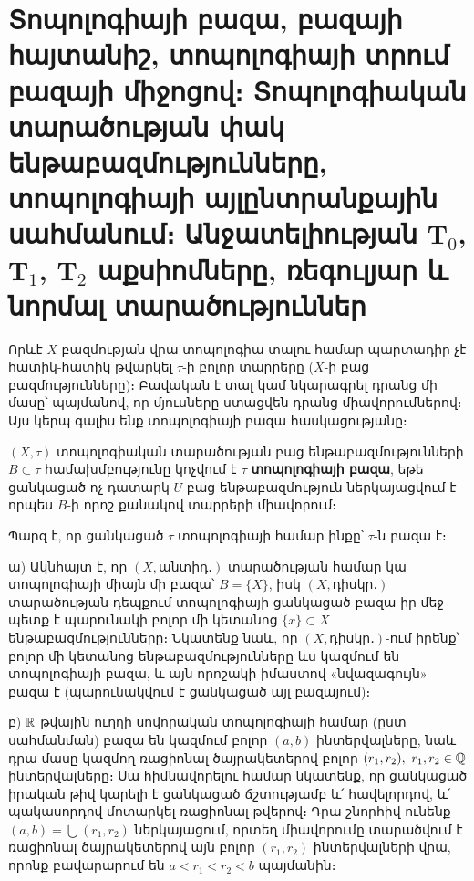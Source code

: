 \documentclass[./main.tex]{subfiles}
\begin{document}
\onehalfspacing
\section{Տոպո\-լոգիայի բազա, բազայի հայտանիշ, տոպո\-լոգիայի տրում բազայի միջոցով։ Տոպո\-լոգիական տարածության փակ ենթաբազմությունները, տոպո\-լոգիայի այլընտրանքային սահմանում։ Անջատելիության $\boldsymbol{\textrm{T}}_0$, $\boldsymbol{\textrm{T}}_1$, $\boldsymbol{\textrm{T}}_2$ աքսիոմները, ռեգուլյար և նորմալ տարածություններ}\label{sec:5}

\par Որևէ $X$ բազմության վրա տոպո\-լոգիա տալու համար պարտադիր չէ հատիկ-հատիկ թվարկել $\tau$-ի բոլոր տարրերը ($X$-ի բաց բազմությունները)։ Բավական է տալ կամ նկարագրել դրանց մի մասը՝ պայմանով, որ մյուսները ստացվեն դրանց միավորումներով։ Այս կերպ գալիս ենք տոպո\-լոգիայի բազա հասկացությանը։
\begin{definition}
$(X, \tau)$ տոպո\-լոգիական տարածության բաց ենթաբազմությունների $B \subset \tau$ համախմբությունը կոչվում է $\tau$ \textbf{տոպո\-լոգիայի բազա}, եթե ցանկացած ոչ դատարկ ${U}$ բաց ենթաբազմություն ներկայացվում է որպես $B$-ի որոշ քանակով տարրերի միա\-վո\-րում։
\end{definition}
Պարզ է, որ ցանկացած $\tau$ տոպոլոգիայի համար ինքը՝ $\tau$-ն բազա է։
\begin{example}\label{ch5ex1} 
ա) Ակնհայտ է, որ $(X, \textrm{անտիդ․})$ տարածության համար կա տոպո\-լոգիայի միայն մի բազա՝ $B=\{X\}$, իսկ $(X, \textrm{դիսկր․})$ տարածության դեպքում տոպո\-լոգիայի ցանկացած բազա իր մեջ պետք է պարունակի բոլոր մի կե\-տա\-նոց ${\{x\} \subset X}$  ենթա\-բազմությունները։ Նկատենք նաև, որ $(X, \textrm{դիսկր․})$-ում իրենք՝ բոլոր մի կե\-տա\-նոց ենթաբազմությունները ևս կազմում են տոպո\-լոգիայի բազա, և այն որոշակի իմաս\-տով «նվազագույն» բազա է (պարունակվում է ցանկացած այլ բազայում)։
    
\par բ) $\mathbb{R}$ թվային ուղղի սովորական տոպո\-լոգիայի համար (ըստ սահմանման) բազա են կազմում բոլոր $(a,b)$ ինտերվալները, նաև դրա մասը կազմող ռացիոնալ \linebreak ծայրա\-կետերով բոլոր $(r_1, r_2),\ {r_1, r_2 \in \mathbb{Q}}$ ինտերվալները։ Սա հիմնավորելու հա\-մար նկա\-տենք, որ ցանկացած իրական թիվ կարելի է ցանկացած ճշտությամբ և՛ հա\-վե\-լոր\-դով, և՛ պակասորդով մոտարկել ռացիոնալ թվերով։ Դրա շնորհիվ ունենք  ${(a,b) =\bigcup{(r_1,r_2 )}}$ ներկայացում, որտեղ միավորումը տարածվում է ռացիոնալ \linebreak ծայրա\-կետերով այն բոլոր $(r_1, r_2)$ ին\-տեր\-վալ\-ների վրա, որոնք բավարարում են \linebreak ${a<r_1<r_2<b}$ պայմանին։
\end{example}
\end{document}
